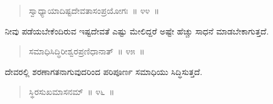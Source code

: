 \vspace{-0.35cm}


\vspace{-0.2cm}

\begin{verse}
ಸ್ವಾಧ್ಯಾಯಾದಿಷ್ಟದೇವತಾಸಂಪ್ರಯೋಗಃ~॥ ೪೪~॥
\end{verse}

\vspace{-0.35cm}


\vspace{0.1cm}

ನೀವು ಪಡೆಯಬೇಕೆಂದಿರುವ ಇಷ್ಟದೇವತೆ ಎಷ್ಟು ಮೇಲಿದ್ದರೆ ಅಷ್ಟೇ ಹೆಚ್ಚು ಸಾಧನೆ ಮಾಡಬೇಕಾಗುತ್ತದೆ. 

\vspace{-0.3cm}

\vspace{0.1cm}

\begin{verse}
ಸಮಾಧಿಸಿದ್ಧಿರೀಶ್ವರಪ್ರಣಿಧಾನಾತ್​~॥ ೪೫~॥
\end{verse}

\vspace{0.05cm}

\vspace{-0.35cm}


\vspace{0.1cm}

ದೇವರಲ್ಲಿ ಶರಣಾಗತನಾಗುವುದರಿಂದ ಪರಿಪೂರ್ಣ ಸಮಾಧಿಯು ಸಿದ್ಧಿಸುತ್ತದೆ. 

\eject

\vspace{-0.35cm}

\begin{verse}
ಸ್ಥಿರಸುಖಮಾಸನಮ್​~॥ ೪೬~॥
\end{verse}

\vspace{-0.35cm}

